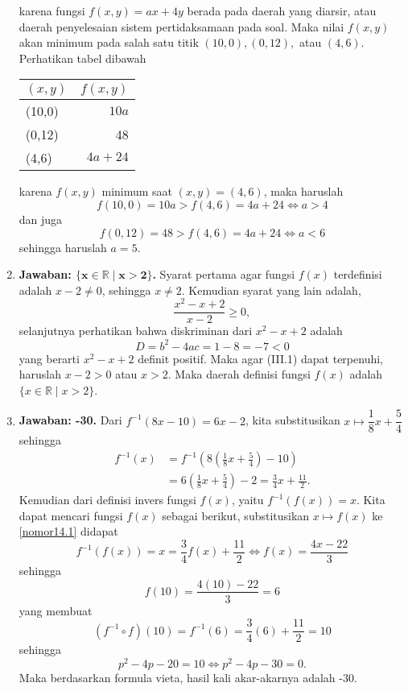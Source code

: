 \begin{enumerate}
\begin{figure}[H]
	\end{figure}
karena fungsi $f(x,y) = ax + 4y$ berada pada daerah yang diarsir, atau daerah penyelesaian sistem pertidaksamaan pada soal. Maka nilai $f(x,y)$ akan minimum pada salah satu titik $(10,0), (0,12),$ atau $(4,6)$. Perhatikan tabel dibawah
	\begin{table}[H]
		\centering
		\begin{tabular}{@{}lr@{}}
		\toprule
		$(x,y)$ & $f(x,y)$\\
		\midrule
		(10,0) & $10a$\\
		(0,12) & 48\\
		(4,6)&$4a+24$\\
		\bottomrule
		\end{tabular}
	\end{table}
karena $f(x,y)$ minimum saat $(x,y) = (4,6)$, maka haruslah \[f(10,0) = 10a > f(4,6) = 4a + 24\Leftrightarrow a > 4\] dan juga \[f(0,12) = 48 > f(4,6) = 4a + 24\Leftrightarrow a < 6\]sehingga haruslah $a=5$.

\item \textbf{Jawaban: $\boldsymbol{\{x\in\mathbb{R}\mid x>2\}}$.} Syarat pertama agar fungsi $f(x)$ terdefinisi adalah $x-2 \neq 0$, sehingga $x\neq 2$. Kemudian syarat yang lain adalah, \begin{equation}\frac{x^2-x+2}{x-2} \geq 0,\end{equation}selanjutnya perhatikan bahwa diskriminan dari $x^2-x+2$ adalah $$D = b^2-4ac = 1 - 8 = -7 < 0$$yang berarti $x^2-x+2$ definit positif. Maka agar (III.1) dapat terpenuhi, haruslah $x-2 > 0$ atau $x>2$. Maka daerah definisi fungsi $f(x)$ adalah $\{x\in\mathbb{R}\mid x>2\}$.

\item \textbf{Jawaban: -30.} Dari $f^{-1}(8x-10) = 6x - 2$, kita substitusikan $x\mapsto \dfrac{1}{8}x + \dfrac{5}{4}$ sehingga \begin{equation}\label{nomor14.1}\begin{split}f^{-1}(x) &= f^{-1}\left(8\left(\frac{1}{8}x + \frac{5}{4}\right)-10\right)\\&= 6\left(\frac{1}{8}x + \frac{5}{4}\right)-2 = \frac{3}{4}x + \frac{11}{2}.\end{split}\end{equation}Kemudian dari definisi invers fungsi $f(x)$, yaitu $f^{-1}(f(x)) = x$. Kita dapat mencari fungsi $f(x)$ sebagai berikut, substitusikan $x\mapsto f(x)$ ke \eqref{nomor14.1} didapat \[f^{-1}(f(x)) = x = \frac{3}{4}f(x) + \frac{11}{2}\Leftrightarrow f(x) = \frac{4x-22}{3}\]sehingga\[f(10) = \frac{4(10)-22}{3} = 6\]yang membuat \[(f^{-1}\circ f)(10) = f^{-1}(6) = \frac{3}{4}(6) + \frac{11}{2} = 10\]sehingga \[p^2-4p-20 = 10\Leftrightarrow p^2-4p-30 = 0.\]Maka berdasarkan formula vieta, hasil kali akar-akarnya adalah -30.


\end{enumerate}
